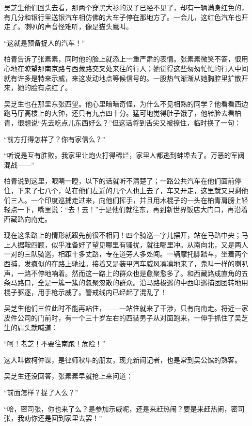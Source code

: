 \par 吴芝生他们回头去看，那两个穿黑大衫的汉子已经不见了，却有一辆满身红色的，有几分和银行里送银汽车相仿佛的大车子停在那地方了。一会儿，这红色汽车也开走了。喇叭的声音怪难听，像是猫头鹰叫。
\par “这就是预备捉人的汽车！”
\par 柏青告诉了张素素，同时他的脸上就添上一重严肃的表情。张素素微笑不答，很用心地在瞭望那南京路与西藏路交叉处来往的行人；她觉得这些匆匆忙忙的行人中间就有许多是特来示威，来这发动地点等候信号的。一股热气渐渐从她胸腔里扩散开来，她的脸有点红了。
\par 吴芝生也在那里东张西望。他心里暗暗奇怪，为什么不见相熟的同学？他看看西边跑马厅高楼上的大钟，还只有九点四十分。猛可地觉得肚子饿了，他转脸去看柏青，很想说“先去吃点儿东西好么？”但这话将到舌尖又被捺住，临时换了一句：
\par “前方打得怎样了？你有家信么？”
\par “听说是互有胜败。我家里让炮火打得稀烂，家里人都逃到蚌埠去了。万恶的军阀混战——”
\par 柏青说到这里，眼睛一瞪，以下的话就听不清楚了；一路公共汽车在他们面前停住，下来了七八个，站在他们左近的几个人也上去了，车又开走，这里就又只剩他们三人。一个印度巡捕走过来，向他们挥手，并且用木棍子的一头在柏青肩膀上轻轻点一下，嘴里说：“去！去！”于是他们就往东，再到新世界饭店大门口，再沿着西藏路向南走。
\par 现在这条路上的情形就跟先前很不相同！四个骑巡一字儿摆开，站在马路中央；马上人据鞍四顾，似乎准备好了望见哪里有骚扰，就往哪里冲。从南向北，又是两人一对的三队骑巡，相距十多丈路，专在道旁人多处闯。一辆摩托脚踏车，坐着两个西捕，发疯似的在路上驰过。接着又是装甲汽车威风凛凛地来了，鬼叫一样的喇叭声，一路不停地响着。然而这一路上的群众也是愈聚愈多了。和西藏路成直角的五条马路口，全是一簇一簇的忽聚忽散的群众。沿马路梭巡的中西印巡捕团团转地用棍子驱逐，用手枪示威了。警戒线内已经起了混乱了！
\par 吴芝生他们三位此时不能再站住，——一站住就来了干涉，只有向南走。将近一家皮件公司的门前时，有一个三十岁左右的西装男子从对面跑来，一伸手抓住了吴芝生的肩头就喊道：
\par “呵！老芝！不要往南跑！危险！”
\par 这人叫做柯仲谋，是律师秋隼的朋友，现充新闻记者，也是常到吴公馆的熟客。
\par 吴芝生还没回答，张素素早就抢上来问道：
\par “前面怎样？捉了人么？”
\par “哈，密司张，你也来了么？是参加示威呢，还是来赶热闹？要是来赶热闹，密司张，我劝你还是回到家里去罢！”
